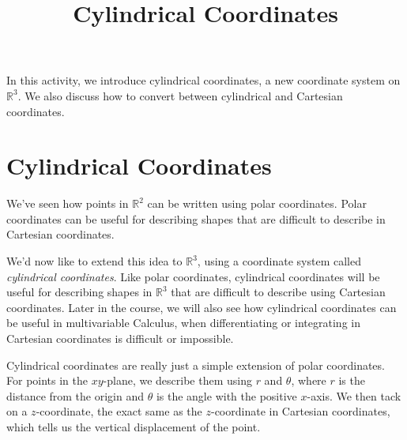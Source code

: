 \documentclass{ximera}
\title{Cylindrical Coordinates}
\begin{document}
\begin{abstract}
\end{abstract}
\maketitle

In this activity, we introduce cylindrical coordinates, a new coordinate system on $\mathbb{R}^3$. We also discuss how to convert between cylindrical and Cartesian coordinates.

\section{Cylindrical Coordinates}

We've seen how points in $\mathbb{R}^2$ can be written using polar coordinates. Polar coordinates can be useful for describing shapes that are difficult to describe in Cartesian coordinates.

We'd now like to extend this idea to $\mathbb{R}^3$, using a coordinate system called \emph{cylindrical coordinates}. Like polar coordinates, cylindrical coordinates will be useful for describing shapes in $\mathbb{R}^3$ that are difficult to describe using Cartesian coordinates. Later in the course, we will also see how cylindrical coordinates can be useful in multivariable Calculus, when differentiating or integrating in Cartesian coordinates is difficult or impossible.

Cylindrical coordinates are really just a simple extension of polar coordinates. For points in the $xy$-plane, we describe them using $r$ and $\theta$, where $r$ is the distance from the origin and $\theta$ is the angle with the positive $x$-axis. We then tack on a $z$-coordinate, the exact same as the $z$-coordinate in Cartesian coordinates, which tells us the vertical displacement of the point.

\begin{image}
\end{image}
\end{document}
